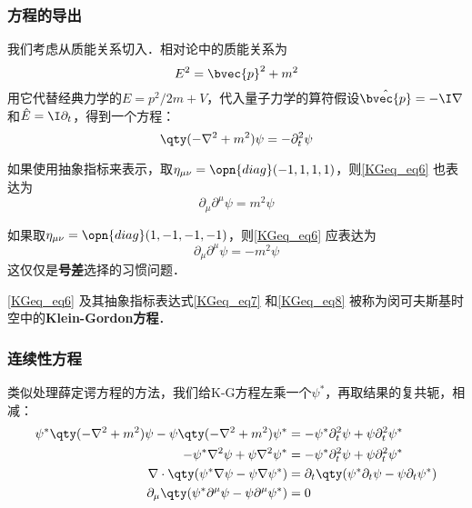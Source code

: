 \subsubsection{方程的导出}

我们考虑从质能关系切入．相对论中的质能关系为
\begin{equation}
E^2=\bvec{p}^2+m^2
\end{equation}
用它代替经典力学的$E=p^2/2m+V$，代入量子力学的算符假设$\hat{\bvec{p}}=-\I\nabla$和$\hat{E}=\I\partial_t$，得到一个方程：
\begin{equation}\label{KGeq_eq6}
\qty(-\nabla^2+m^2)\psi = -\partial_t^2 \psi
\end{equation}

如果使用抽象指标来表示，取$\eta_{\mu\nu}=\opn{diag}(-1, 1, 1, 1)$，则\autoref{KGeq_eq6} 也表达为
\begin{equation}\label{KGeq_eq7}
\partial_\mu\partial^\mu \psi = m^2\psi
\end{equation}

如果取$\eta_{\mu\nu}=\opn{diag}(1, -1, -1, -1)$，则\autoref{KGeq_eq6} 应表达为
\begin{equation}\label{KGeq_eq8}
\partial_\mu\partial^\mu \psi = -m^2\psi
\end{equation}
这仅仅是\textbf{号差}选择的习惯问题．

\autoref{KGeq_eq6} 及其抽象指标表达式\autoref{KGeq_eq7} 和\autoref{KGeq_eq8} 被称为闵可夫斯基时空中的\textbf{Klein-Gordon方程}．



\subsubsection{连续性方程}

类似处理薛定谔方程的方法，我们给K-G方程左乘一个$\psi^*$，再取结果的复共轭，相减：
\begin{equation}\label{KGeq_eq9}
\begin{aligned}
\psi^*\qty(-\nabla^2+m^2)\psi-\psi\qty(-\nabla^2+m^2)\psi^* &= -\psi^*\partial_t^2 \psi+\psi\partial_t^2 \psi^*\\
-\psi^*\nabla^2\psi+\psi\nabla^2\psi^* &= -\psi^*\partial_t^2\psi+\psi\partial_t^2\psi^*\\
\nabla\cdot\qty(\psi^*\nabla\psi-\psi\nabla\psi^*) &= \partial_t\qty(\psi^*\partial_t\psi-\psi\partial_t\psi^*)\\
\partial_\mu\qty(\psi^*\partial^\mu\psi-\psi\partial^\mu\psi^*) & =0
\end{aligned}
\end{equation}


